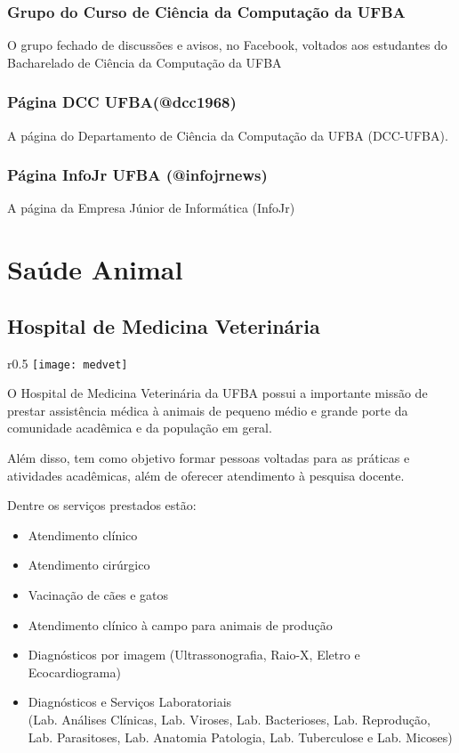         \subsubsection{Grupo do Curso de Ciência da Computação da UFBA}
        O grupo fechado de discussões e avisos, no Facebook, voltados aos estudantes do Bacharelado de Ciência da Computação da UFBA
        
        \subsubsection{Página DCC UFBA(@dcc1968)}
        A página do Departamento de Ciência da Computação da UFBA (DCC-UFBA).
        
        \subsubsection{Página InfoJr UFBA (@infojrnews)} 
        A página da Empresa Júnior de Informática (InfoJr)
        

\section{Saúde Animal}
    \subsection{Hospital de Medicina Veterinária}
            
            \begin{wrapfigure}{r}{0.5\textwidth}
        \centering
 \texttt{[image: medvet]}
    \end{wrapfigure}
    
        O Hospital de Medicina Veterinária da UFBA possui a importante missão de prestar assistência médica à animais de pequeno médio e grande porte da comunidade acadêmica e da população em geral. 
        
        Além disso, tem como objetivo formar pessoas voltadas para as práticas e atividades acadêmicas, além de oferecer atendimento à pesquisa docente. 
        
       
        
    Dentre os serviços prestados estão:
        
        \begin{itemize}
            \item Atendimento clínico 
	        \item Atendimento cirúrgico
	        \item Vacinação de cães e gatos
	        \item Atendimento clínico à campo para animais de produção
	        \item Diagnósticos por imagem (Ultrassonografia, Raio-X, Eletro e Ecocardiograma)	
	        \item Diagnósticos e Serviços Laboratoriais \\
	        (Lab. Análises Clínicas, Lab. Viroses, Lab. Bacterioses, Lab. Reprodução, Lab. Parasitoses, Lab. Anatomia Patologia, Lab. Tuberculose e Lab. Micoses)
        \end{itemize}
        
